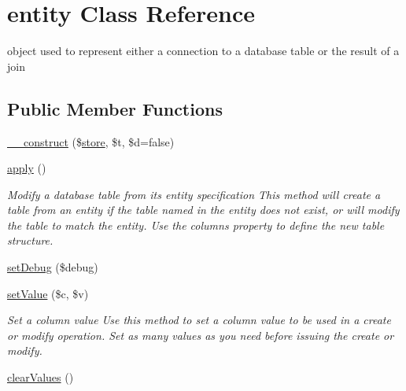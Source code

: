 \hypertarget{classentity}{}\section{entity Class Reference}
\label{classentity}


object used to represent either a connection to a database table or the result of a join  


\subsection*{Public Member Functions}
\begin{DoxyCompactItemize}
\item 
\hyperlink{classentity_a2411a96bf911703bf07e8bac90ffa7f7}{\+\_\+\+\_\+construct} (\$\hyperlink{classstore}{store}, \$t, \$d=false)
\item 
\hypertarget{classentity_ad0ef3e5b12dcd2964ac88226e64851ed}{}\hyperlink{classentity_ad0ef3e5b12dcd2964ac88226e64851ed}{apply} ()\label{classentity_ad0ef3e5b12dcd2964ac88226e64851ed}

\begin{DoxyCompactList}\small\item\em Modify a database table from its entity specification This method will create a table from an entity if the table named in the entity does not exist, or will modify the table to match the entity. Use the columns property to define the new table structure. \end{DoxyCompactList}\item 
\hyperlink{classentity_aa133d346b349c6b0af1566c89234192c}{set\+Debug} (\$debug)
\item 
\hyperlink{classentity_a11cae02dda3cc8b9ad4966e33ef11a2a}{set\+Value} (\$c, \$v)
\begin{DoxyCompactList}\small\item\em Set a column value Use this method to set a column value to be used in a create or modify operation. Set as many values as you need before issuing the create or modify. \end{DoxyCompactList}\item 
\hypertarget{classentity_a7afa5fa5ccc2f9b9a0390cad59ecfede}{}\hyperlink{classentity_a7afa5fa5ccc2f9b9a0390cad59ecfede}{clear\+Values} ()\label{classentity_a7afa5fa5ccc2f9b9a0390cad59ecfede}


\end{DoxyCompactItemize}
